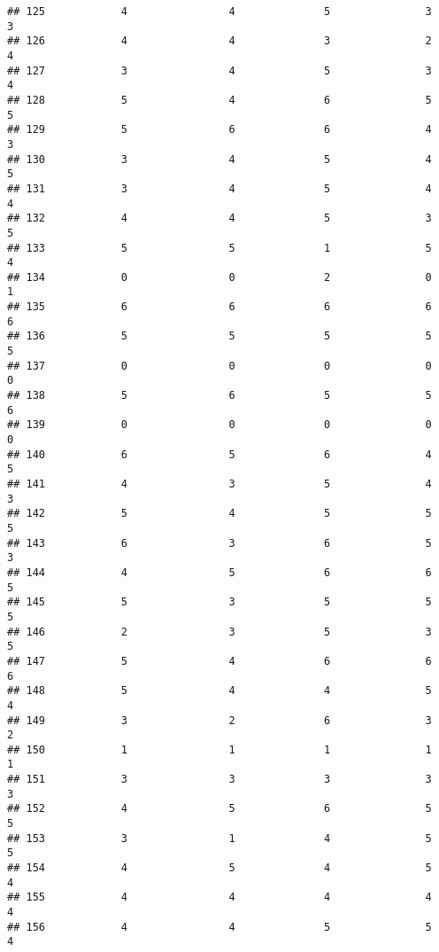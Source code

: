 \documentclass[
]{article}
\begin{document}
\begin{verbatim}
## 125            4                4              5               3              3
## 126            4                4              3               2              4
## 127            3                4              5               3              4
## 128            5                4              6               5              5
## 129            5                6              6               4              3
## 130            3                4              5               4              5
## 131            3                4              5               4              4
## 132            4                4              5               3              5
## 133            5                5              1               5              4
## 134            0                0              2               0              1
## 135            6                6              6               6              6
## 136            5                5              5               5              5
## 137            0                0              0               0              0
## 138            5                6              5               5              6
## 139            0                0              0               0              0
## 140            6                5              6               4              5
## 141            4                3              5               4              3
## 142            5                4              5               5              5
## 143            6                3              6               5              3
## 144            4                5              6               6              5
## 145            5                3              5               5              5
## 146            2                3              5               3              5
## 147            5                4              6               6              6
## 148            5                4              4               5              4
## 149            3                2              6               3              2
## 150            1                1              1               1              1
## 151            3                3              3               3              3
## 152            4                5              6               5              5
## 153            3                1              4               5              5
## 154            4                5              4               5              4
## 155            4                4              4               4              4
## 156            4                4              5               5              4

\end{verbatim}
\end{document}
